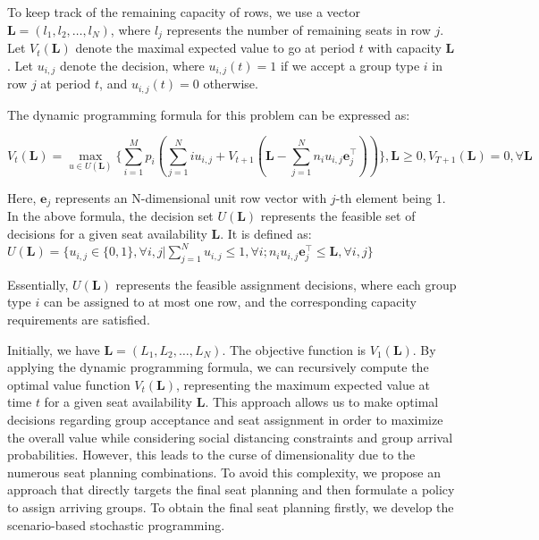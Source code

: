 To keep track of the remaining capacity of rows, we use a vector $\mathbf{L} = (l_1, l_2, \ldots, l_N)$, where $l_j$ represents the number of remaining seats in row $j$. Let $V_t(\mathbf{L})$ denote the maximal expected value to go at period $t$ with capacity $\mathbf{L}$. Let $u_{i,j}$ denote the decision, where $u_{i,j}(t) = 1$ if we accept a group type $i$ in row $j$ at period $t$, and $u_{i,j}(t) = 0$ otherwise.

The dynamic programming formula for this problem can be expressed as:

$$V_{t}(\mathbf{L}) = \max_{u \in U(\mathbf{L})}\{ \sum_{i=1}^{M} p_i ( \sum_{j=1}^{N} i u_{i,j} + V_{t+1}(\mathbf{L}- \sum_{j=1}^{N} n_i u_{i,j}\mathbf{e}_j^{\top} ))\}, \mathbf{L} \geq 0, V_{T+1}(\mathbf{L}) =0, \forall \mathbf{L}$$

Here, $\mathbf{e}_j$ represents an N-dimensional unit row vector with $j$-th element being 1. In the above formula, the decision set $U(\mathbf{L})$ represents the feasible set of decisions for a given seat availability $\mathbf{L}$. It is defined as: $U(\mathbf{L}) = \{u_{i,j} \in\{0,1\}, \forall i,j| \sum_{j=1}^{N} u_{i,j} \leq 1, \forall i; n_{i}u_{i,j}\mathbf{e}_j^{\top} \leq \mathbf{L}, \forall i,j \}$ 

Essentially, $U(\mathbf{L})$ represents the feasible assignment decisions, where each group type $i$ can be assigned to at most one row, and the corresponding capacity requirements are satisfied.

Initially, we have $\mathbf{L} = (L_1, L_2, \ldots, L_{N})$. The objective function is $V_1(\mathbf{L})$. By applying the dynamic programming formula, we can recursively compute the optimal value function $V_t(\mathbf{L})$, representing the maximum expected value at time $t$ for a given seat availability $\mathbf{L}$. This approach allows us to make optimal decisions regarding group acceptance and seat assignment in order to maximize the overall value while considering social distancing constraints and group arrival probabilities. However, this leads to the curse of dimensionality due to the numerous seat planning combinations. To avoid this complexity, we propose an approach that directly targets the final seat planning and then formulate a policy to assign arriving groups. To obtain the final seat planning firstly, we develop the scenario-based stochastic programming.


